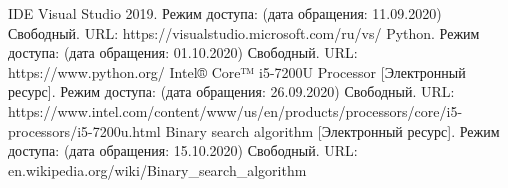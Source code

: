 %




	
	\begin{center}
	\begin{thebibliography}{3}
	IDE Visual Studio 2019. Режим доступа: (дата обращения: 11.09.2020) Свободный. URL: https://visualstudio.microsoft.com/ru/vs/
	Python. Режим доступа: (дата обращения: 01.10.2020) Свободный. URL: https://www.python.org/
	Intel® Core™ i5-7200U Processor [Электронный ресурс]. Режим доступа: (дата обращения: 26.09.2020) Свободный. URL: https://www.intel.com/content/www/us/en/products/processors/core/i5-processors/i5-7200u.html
	Binary search algorithm [Электронный ресурс]. Режим доступа: (дата обращения: 15.10.2020) Свободный. URL: en.wikipedia.org/wiki/Binary\_search\_algorithm
	\end{thebibliography}
	\end{center}